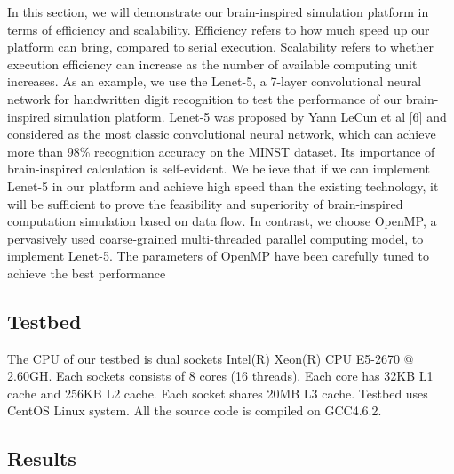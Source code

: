 In this section, we will demonstrate our brain-inspired simulation platform in terms of efficiency and scalability. Efficiency refers to how much speed up our platform can bring, compared to serial execution. Scalability refers to whether execution efficiency can increase as the number of available computing unit increases. 
As an example, we use the Lenet-5, a 7-layer convolutional neural network for handwritten digit recognition to test the performance of our brain-inspired simulation platform. Lenet-5 was proposed by Yann LeCun et al [6] and considered as the most classic convolutional neural network, which can achieve more than 98\% recognition accuracy on the MINST dataset. Its importance of brain-inspired calculation is self-evident. We believe that if we can implement Lenet-5 in our platform and achieve high speed than the existing technology, it will be sufficient to prove the feasibility and superiority of brain-inspired computation simulation based on data flow.
In contrast, we choose OpenMP, a pervasively used coarse-grained multi-threaded parallel computing model, to implement Lenet-5. The parameters of OpenMP have been carefully tuned to achieve the best performance

\subsection{Testbed}
The CPU of our testbed is dual sockets Intel(R) Xeon(R) CPU E5-2670 @ 2.60GH. Each sockets consists of 8 cores (16 threads). Each core has 32KB L1 cache and 256KB L2 cache. Each socket shares 20MB L3 cache. Testbed uses CentOS Linux system. All the source code is compiled on GCC4.6.2.
\subsection{Results}
 
